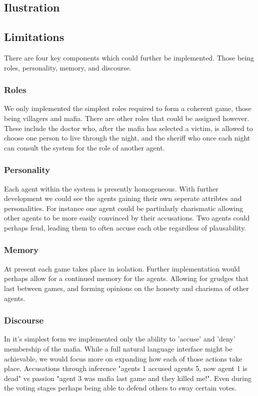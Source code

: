 \documentclass[12pt]{article} %
\begin{document}
\subsection{Ilustration}

\subsection{Limitations}

There are four key components which could further be implemented. Those being roles, personality, memory, and discourse.

\subsubsection{Roles}
We only implemented the simplest roles required to form a coherent game, those being villagers and mafia. There are other roles that could be assigned however. These include the doctor who, after the mafia has selected a victim, is allowed to choose one person to live through the night, and the sheriff who once each night can consult the system for the role of another agent.

\subsubsection{Personality}
Each agent within the system is presently homogeneous. With further development we could see the agents gaining their own seperate attribtes and personalities. For instance one agent could be partiularly charismatic allowing other agents to be more easily convinced by their accusations. Two agents could perhaps feud, leading them to often accuse each othe regardless of plausability.


\subsubsection{Memory}
At present each game takes place in isolation. Further implementation would perhaps allow for a continued memory for the agents. Allowing for grudges that last between games, and forming opinions on the honesty and charisma of other agents.

\subsubsection{Discourse}
In it's simplest form we implemented only the ability to 'accuse' and 'deny' membership of the mafia. While a full natural language interface might be achievable, we would focus more on expanding how each of those actions take place. Accusations through inference "agents 1 accused agents 5, now agent 1 is dead" vs passion "agent 3 was mafia last game and they killed me!". Even during the voting stages perhaps being able to defend others to sway certain votes.
\end{document}
